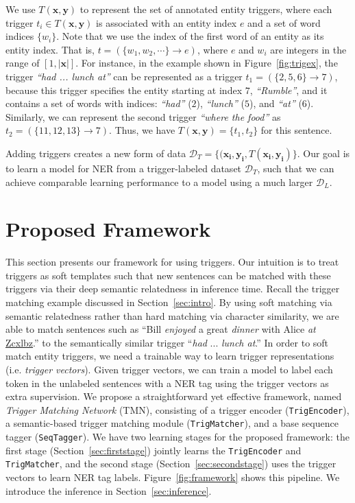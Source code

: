 We use $T(\mathbf{x},\mathbf{y})$ to represent the set of annotated entity triggers, where each trigger $t_i\in T(\mathbf{x},\mathbf{y})$ is associated with an entity index $e$ and a set of word indices $\{w_i\}$.
Note that we use the index of the first word of an entity as its entity index.
That is, $t = (\{w_1, w_2, \cdots\}\rightarrow{e})$, where $e$ and $w_i$ are integers in the range of $[1,|\mathbf{x}|]$. \quad
For instance, in the example shown in Figure~\ref{fig:trigex}, the trigger \textit{``had ... lunch at''} can be represented as a trigger $t_1=(\{2,5,6\}\rightarrow{7})$, because this trigger specifies the entity starting at index $7$, \textit{``Rumble''}, and it contains a set of words with indices: \textit{``had''} ($2$), \textit{``lunch''} ($5$), and \textit{``at''} ($6$).
Similarly, we can represent the second trigger \textit{``where the food''} as $t_2 = (\{11,12,13\}\rightarrow{7})$.
Thus, we have $T(\mathbf{x},\mathbf{y})=\{t_1, t_2\}$ for this sentence.

Adding triggers creates a new form of data $\mathcal{D}_{T} = \{(\mathbf{x_i},\mathbf{y_i}, T(\mathbf{x_i},\mathbf{y_i})\}$. 
Our goal is to learn a model for NER from a trigger-labeled dataset $\mathcal{D}_T$, such that we can achieve comparable learning performance to a model using a much larger $\mathcal{D}_L$.





\section{Proposed Framework}
\label{sec:tmn}
This section presents our framework for using triggers. Our intuition is to treat triggers as soft templates such that new sentences can be matched with these triggers via their deep semantic relatedness in inference time. Recall the trigger matching example discussed in Section~\ref{sec:intro}. By using soft matching via semantic relatedness rather than hard matching via character similarity, we are able to match sentences such as ``Bill \textit{enjoyed} a great \textit{dinner} with Alice \textit{at} \underline{Zcxlbz}.'' to the semantically similar trigger ``\textit{had} ... \textit{lunch at}.''
In order to soft match entity triggers, we need a trainable way to learn trigger representations (i.e. \textit{trigger vectors}).
Given trigger vectors, we can train a model to label each token in the unlabeled sentences with a NER tag using the trigger vectors as extra supervision.
We propose a straightforward yet effective framework, named \textit{Trigger Matching Network} (TMN), consisting of a trigger encoder ({\texttt{TrigEncoder}}), a semantic-based trigger matching module (\texttt{TrigMatcher}), and a base {sequence tagger} (\texttt{SeqTagger}). 
We have two learning stages for the proposed framework: the first stage (Section~\ref{sec:firststage}) jointly learns the \texttt{TrigEncoder} and \texttt{TrigMatcher}, and the second stage (Section~\ref{sec:secondstage}) uses the trigger vectors to learn NER tag labels.
Figure~\ref{fig:framework} shows this pipeline. We introduce the inference in Section~\ref{sec:inference}.




